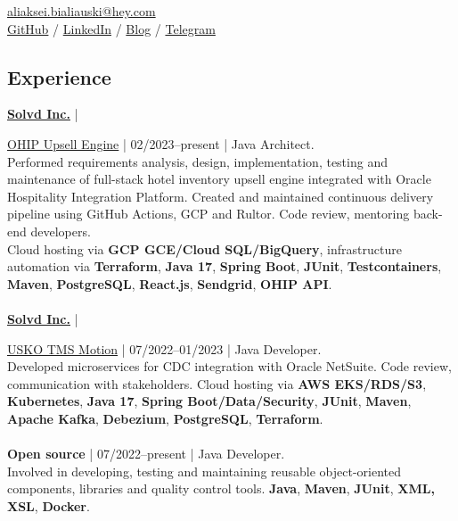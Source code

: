 \documentclass{h1alexbel}
\begin{document}
    \sffamily

    \printPhoto{}

    {\scshape\bfseries\Large {}}\newline
    \href{mailto:aliaksei.bialiauski@hey.com}{aliaksei.bialiauski@hey.com}\\
    \href{https://github.com/h1alexbel}{GitHub} /
    \href{https://www.linkedin.com/in/h1alexbel/}{LinkedIn} /
    \href{https://h1alexbel.github.io}{Blog} /
    \href{https://t.me/h1alexbel}{Telegram}

    \subsection*{Experience}
    \vspace{-7pt}
    \small
    \textbf{\href{https://www.solvd.com}{Solvd Inc.}} | {\href{https://upsell.northviewhg.com}{OHIP Upsell Engine} | 02/2023--present | Java Architect.\\
    Performed requirements analysis, design, implementation, testing and maintenance
    of full-stack hotel inventory upsell engine integrated with Oracle Hospitality Integration Platform.
    Created and maintained continuous delivery pipeline using GitHub Actions, GCP and Rultor.
    Code review, mentoring back-end developers.\\
    Cloud hosting via \textbf{GCP GCE/Cloud SQL/BigQuery},
    infrastructure automation via \textbf{Terraform},
    \textbf{Java 17},
    \textbf{Spring Boot},
    \textbf{JUnit},
    \textbf{Testcontainers},
    \textbf{Maven},
    \textbf{PostgreSQL},
    \textbf{React.js},
    \textbf{Sendgrid},
    \textbf{OHIP API}.
    \\\\
    \textbf{\href{https://www.solvd.com}{Solvd Inc.}} | {\href{https://motiontms.com}{USKO TMS Motion} | 07/2022--01/2023 | Java Developer.\\
    Developed microservices for CDC integration with Oracle NetSuite.
    Code review, communication with stakeholders.
    Cloud hosting via \textbf{AWS EKS/RDS/S3},
    \textbf{Kubernetes},
    \textbf{Java 17},
    \textbf{Spring Boot/Data/Security},
    \textbf{JUnit},
    \textbf{Maven},
    \textbf{Apache Kafka},
    \textbf{Debezium},
    \textbf{PostgreSQL},
    \textbf{Terraform}.
    \vspace{-7pt}
    \\\\
    \textbf{Open source} | 07/2022--present | Java Developer.\\
    Involved in developing, testing and maintaining reusable object-oriented components, libraries
    and quality control tools.
    \textbf{Java},
    \textbf{Maven},
    \textbf{JUnit},
    \textbf{XML, XSL},
    \textbf{Docker}.
    \vspace{-7pt}

}}
\end{document}
